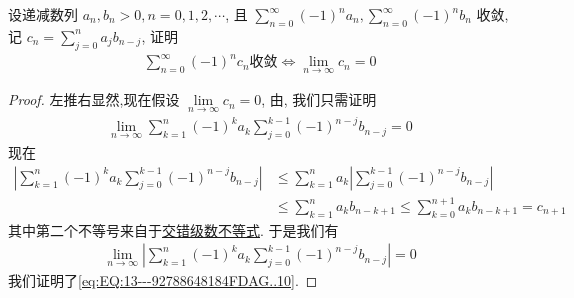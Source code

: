 \documentclass[../../main.tex]{subfiles}
\begin{document}
\begin{example}
设递减数列 $a_n, b_n > 0, n = 0, 1, 2, \cdots$, 且 $\sum\limits_{n=0}^{\infty} (-1)^n a_n, \sum\limits_{n=0}^{\infty} (-1)^n b_n$ 收敛, 记 $c_n = \sum\limits_{j=0}^{n} a_j b_{n-j}$, 证明
\begin{align}
\sum\limits_{n=0}^{\infty} (-1)^n c_n \text{收敛} \iff \lim\limits_{n\to\infty} c_n = 0
\label{eq:EQ:13---92788648184FDAG..10}
\end{align}
\end{example}
\begin{proof}
左推右显然,现在假设 $\lim\limits_{n\to\infty} c_n = 0$, 由, 我们只需证明
\begin{align*}
\lim\limits_{n\to\infty} \sum\limits_{k=1}^{n} (-1)^k a_k \sum\limits_{j=0}^{k-1} (-1)^{n-j} b_{n-j} = 0
\end{align*}
现在
\begin{align*}
\left| \sum\limits_{k=1}^{n} (-1)^k a_k \sum\limits_{j=0}^{k-1} (-1)^{n-j} b_{n-j} \right| &\leqslant \sum\limits_{k=1}^{n} a_k \left| \sum\limits_{j=0}^{k-1} (-1)^{n-j} b_{n-j} \right| \\
&\leqslant \sum\limits_{k=1}^{n} a_k b_{n - k + 1} \leqslant \sum\limits_{k=0}^{n+1} a_k b_{n - k + 1} = c_{n+1}
\end{align*}
其中第二个不等号来自于\hyperref[theorem:交错级数不等式]{交错级数不等式}. 于是我们有
\begin{align*}
\lim\limits_{n\to\infty} \left| \sum\limits_{k=1}^{n} (-1)^k a_k \sum\limits_{j=0}^{k-1} (-1)^{n-j} b_{n-j} \right| = 0
\end{align*}
我们证明了\eqref{eq:EQ:13---92788648184FDAG..10}.
\end{proof}
\end{document}
